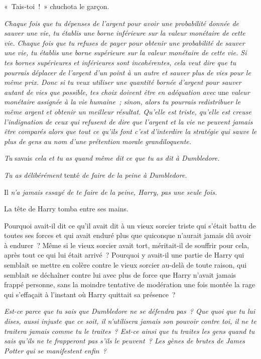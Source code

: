 «~Tais-toi~!~» chuchota le garçon.

\emph{Chaque fois que tu dépenses de l'argent pour avoir une probabilité donnée de sauver une vie, tu établis une borne inférieure sur la valeur monétaire de cette vie. Chaque fois que tu refuses de payer pour obtenir une probabilité de sauver une vie, tu établis une borne supérieure sur la valeur monétaire de cette vie. Si tes bornes supérieures et inférieures sont incohérentes, cela veut dire que tu pourrais déplacer de l'argent d'un point à un autre et sauver plus de vies pour le même prix. Donc si tu veux utiliser une quantité bornée d'argent pour sauver autant de vies que possible, tes choix doivent être en adéquation avec} une \emph{valeur monétaire assignée à la vie humaine~; sinon, alors tu pourrais redistribuer le même argent et obtenir un meilleur résultat. Qu'elle est triste, qu'elle est creuse l'indignation de ceux qui refusent de dire que l'argent et la vie ne peuvent jamais être comparés alors que tout ce qu'ils font c'est d'interdire la stratégie qui sauve le plus de gens au nom d'une prétention morale grandiloquente.}

\emph{Tu} savais \emph{cela et tu as quand même dit ce que tu as dit à Dumbledore.}

\emph{Tu as délibérément} tenté \emph{de faire de la peine à Dumbledore.}

Il \emph{n'a jamais essayé de te faire de la peine, Harry, pas une seule fois.}

La tête de Harry tomba entre ses mains.

Pourquoi avait-il dit ce qu'il avait dit à un vieux sorcier triste qui s'était battu de toutes ses forces et qui avait enduré plus que quiconque n'aurait jamais dû avoir à endurer~? Même si le vieux sorcier avait tort, méritait-il de souffrir pour cela, après tout ce qui lui était arrivé~? Pourquoi y avait-il une partie de Harry qui semblait se mettre en colère contre le vieux sorcier au-delà de toute raison, qui semblait se déchaîner contre lui avec plus de force que Harry n'avait jamais frappé personne, sans la moindre tentative de modération une fois montée la rage qui s'effaçait à l'instant où Harry quittait sa présence~?

\emph{Est-ce parce que tu sais que Dumbledore ne se défendra pas~? Que quoi que tu lui dises, aussi injuste que ce soit, il n'utilisera jamais son pouvoir contre toi, il ne te traitera jamais comme tu le traites~? Est-ce ainsi que tu traites les gens quand tu sais qu'ils ne te frapperont pas s'ils le peuvent~? Les gènes de brutes de James Potter qui se manifestent enfin~?}

